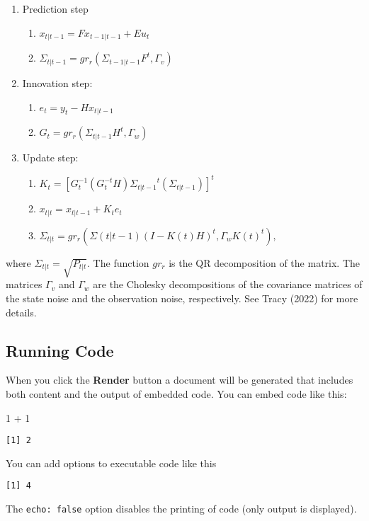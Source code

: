\documentclass[
  letterpaper,
  DIV=11,
  numbers=noendperiod]{scrartcl}
\newenvironment{Shaded}{\begin{snugshade}}{\end{snugshade}}
\newcommand{\DecValTok}[1]{\textcolor[rgb]{0.68,0.00,0.00}{#1}}
\newcommand{\SpecialCharTok}[1]{\textcolor[rgb]{0.37,0.37,0.37}{#1}}
\begin{document}
\begin{enumerate}
\def\labelenumi{\arabic{enumi}.}
\item
  Prediction step

  \begin{enumerate}
  \def\labelenumii{\arabic{enumii}.}
  \item
    \(x_{t|t-1} = F x_{t-1|t-1} + E u_t\)
  \item
    \(\Sigma_{t|t-1} = gr_r(\Sigma_{t-1|t-1} F^t, \Gamma_v)\)
  \end{enumerate}
\item
  Innovation step:

  \begin{enumerate}
  \def\labelenumii{\arabic{enumii}.}
  \item
    \(e_t = y_t - H x_{t|t-1}\)
  \item
    \(G_t = gr_r (\Sigma_{t|t-1} H^t, \Gamma_w)\)
  \end{enumerate}
\item
  Update step:

  \begin{enumerate}
  \def\labelenumii{\arabic{enumii}.}
  \item
    \(K_t={[G_t^{-1} (G_t^{-t} H) {\Sigma_{t|t-1}}^t(\Sigma_{t|t-1})]}^t\)
  \item
    \(x_{t|t} = x_{t|t-1} + K_t e_t\)
  \item
    \(\Sigma_{t|t} = gr_r(\Sigma(t|t-1) {(I - K(t) H)}^t, \Gamma_w {K(t)}^t),\)
  \end{enumerate}
\end{enumerate}

where \(\Sigma_{t|t}=\sqrt{P_{t|t}}\). The function \(gr_r\) is the QR
decomposition of the matrix. The matrices \(\Gamma_v\) and \(\Gamma_w\)
are the Cholesky decompositions of the covariance matrices of the state
noise and the observation noise, respectively. See Tracy (2022) for more
details.

\subsection{Running Code}\label{running-code}

When you click the \textbf{Render} button a document will be generated
that includes both content and the output of embedded code. You can
embed code like this:

\begin{Shaded}
\begin{Highlighting}[]
\DecValTok{1} \SpecialCharTok{+} \DecValTok{1}
\end{Highlighting}
\end{Shaded}

\begin{verbatim}
[1] 2
\end{verbatim}

You can add options to executable code like this

\begin{verbatim}
[1] 4
\end{verbatim}

The \texttt{echo:\ false} option disables the printing of code (only
output is displayed).
\end{document}
